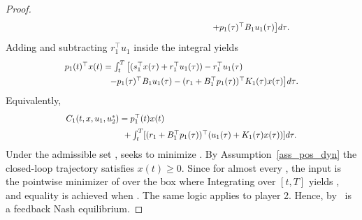 \documentclass[letterpaper, 10 pt, conference]{ieeeconf}
\theoremstyle{definition}
\begin{document}
\begin{proof}
\begin{align*}
    &~~~~~~~~~~~~~~~~~~~~~~~~~~~~~~~~~~~~~~~~~~~~~~\scalebox{.87}{$+p_1(\tau)^{\top}B_1u_1(\tau)\big]d\tau$.}
\end{align*}
Adding and subtracting $r_1^{\top}u_1$ inside the integral yields
\begin{align*}
    &\scalebox{.87}{$p_1(t)^{\top}x(t)=\int_t^T\big[(s_1^{\top}x(\tau)+r_1^{\top}u_1(\tau))-r_1^{\top}u_1(\tau)$}\\
    &~~~~~~~~~~~~~~\scalebox{.87}{$-p_1(\tau)^{\top}B_1u_1(\tau)-(r_1+B_1^{\top}p_1(\tau))^{\top}K_1(\tau)x(\tau) \big]d \tau$.}
\end{align*}
Equivalently,
\begin{align}\label{C_aux}
    &\scalebox{.87}{$C_1(t, x, u_1, u_2^*)=p_1^{\top}(t)x(t)$}\\
    &~~~~~~~~~~~~~~~~~~\scalebox{.87}{$+\int_t^T [(r_1+B_1^{\top}p_1(\tau))^{\top}(u_1(\tau)+K_1(\tau)x(\tau))]d\tau.$}\notag
\end{align}
Under the admissible set ,  seeks to minimize . By Assumption~\ref{ass_pos_dyn} the closed-loop trajectory satisfies $x(t)\geq 0$. Since  for almost every \scalebox{.92}{$\tau \in [t, T]$}, the input  is the pointwise minimizer of  over the box \scalebox{.92}{$[-E_1x(t), E_1x(t)]$} where  %
Integrating over $[t,T]$ yields , and equality is achieved when . The same logic applies to player 2. Hence, by~\cite[Definition 6.2]{basar}  is a feedback Nash equilibrium.
\end{proof}
\end{document}
